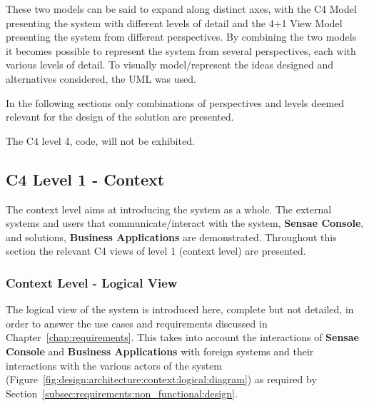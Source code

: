 These two models can be said to expand along distinct axes, with the C4 Model presenting the system with different levels of detail and the 4+1 View Model presenting the system from different perspectives. By combining the two models it becomes possible to represent the system from several perspectives, each with various levels of detail.
To visually model/represent the ideas designed and alternatives considered, the \gls{UML} was used.

In the following sections only combinations of perspectives and levels deemed relevant for the design of the solution are presented.

The C4 level 4, code, will not be exhibited.

\subsection{C4 Level 1 - Context}
\label{subsec:design:architecture:context}

The context level aims at introducing the system as a whole. The external systems and users that communicate/interact with the system, \textbf{Sensae Console}, and solutions, \textbf{Business Applications} are demonstrated.
Throughout this section the relevant C4 views of level 1 (context level) are presented.

\subsubsection{Context Level - Logical View}
\label{subsubsec:design:architecture:context:logical}

The logical view of the system is introduced here, complete but not detailed, in order to answer the use cases and requirements discussed in Chapter~\ref{chap:requirements}. This takes into account the interactions of \textbf{Sensae Console} and \textbf{Business Applications} with foreign systems and their interactions with the various actors of the system (Figure~\ref{fig:design:architecture:context:logical:diagram}) as required by Section~\ref{subsec:requirements:non_functional:design}.

